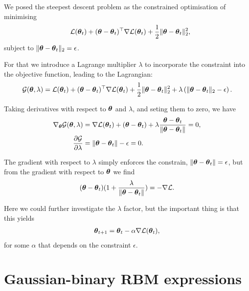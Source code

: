 We posed the steepest descent problem as the constrained optimisation of minimising
\begin{align*}
\quad \mathcal{L}(\boldsymbol{\theta}_{t}) + (\boldsymbol{\theta} - \boldsymbol{\theta}_t)^\top \nabla \mathcal{L}(\boldsymbol{\theta}_{t}) + \frac{1}{2} \| \boldsymbol{\theta} - \boldsymbol{\theta}_t \|_2^2,
\end{align*}
subject to $\| \boldsymbol{\theta} - \boldsymbol{\theta}_t \|_2 = \epsilon$.

For that we introduce a Lagrange multiplier $\lambda$ to incorporate the constraint into the objective function, leading to the Lagrangian:
\begin{align*}
\mathcal{G}(\boldsymbol{\theta}, \lambda) = \mathcal{L}(\boldsymbol{\theta}_{t}) + (\boldsymbol{\theta} - \boldsymbol{\theta}_t)^\top \nabla \mathcal{L}(\boldsymbol{\theta}_{t}) + \frac{1}{2} \| \boldsymbol{\theta} - \boldsymbol{\theta}_t \|_2^2 + \lambda \left( \| \boldsymbol{\theta} - \boldsymbol{\theta}_t \|_2 - \epsilon \right).
\end{align*}

Taking derivatives with respect to \( \boldsymbol{\theta} \) and \( \lambda \), and seting them to zero, we have
\begin{align*}
\nabla_{\boldsymbol{\theta}} \mathcal{G}(\boldsymbol{\theta}, \lambda) &= \nabla \mathcal{L}(\boldsymbol{\theta}_{t}) + (\boldsymbol{\theta} - \boldsymbol{\theta}_t) + \lambda \frac{\boldsymbol{\theta} - \boldsymbol{\theta}_t}{\| \boldsymbol{\theta} - \boldsymbol{\theta}_t \|} = 0,    \\
\frac{\partial \mathcal{G}}{\partial \lambda} &= \| \boldsymbol{\theta} - \boldsymbol{\theta}_t \| - \epsilon = 0.
\end{align*}

The gradient with respect to $\lambda$ simply enforces the constrain, $\| \boldsymbol{\theta} - \boldsymbol{\theta}_t \| = \epsilon$, but from the gradient with respect to $ \boldsymbol{\theta} $ we find
\begin{align*}
(\boldsymbol{\theta} - \boldsymbol{\theta}_t)(1 +  \frac{\lambda}{\| \boldsymbol{\theta} - \boldsymbol{\theta}_t \|}) = - \nabla \mathcal{L}.
\end{align*}

Here we could further investigate the $\lambda$ factor, but the important thing is that this yields
\begin{align*}
\boldsymbol{\theta}_{t+1} = \boldsymbol{\theta}_t - \alpha \nabla \mathcal{L}(\boldsymbol{\theta}_{t}), 
\end{align*}
for some $\alpha$ that depends on the constraint $\epsilon$.

\section{Gaussian-binary RBM expressions}\label{appendix:rbm}

